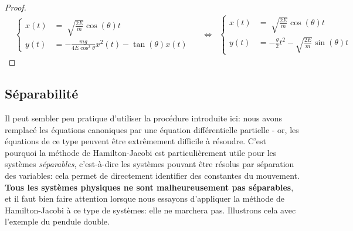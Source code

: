 \documentclass[11pt,oneside,a4paper]{article}
\begin{document}
\begin{proof}
\begin{align}
        &\begin{cases}
          x(t) &= \sqrt[]{\frac{2E}{m}}\cos\left(\theta\right)t\\
          y(t) &= -\frac{mg}{4E\cos^2\theta}x^2(t)-\tan\left(\theta\right) x(t)
        \end{cases} &
        &\Leftrightarrow &
        \begin{cases}
          x(t) &= \sqrt[]{\frac{2E}{m}}\cos\left(\theta\right)t\\
          y(t) &= -\frac{g}{2}t^2-\sqrt{\frac{2E}{m}}\sin\left(\theta\right) t
        \end{cases}
      \end{align}
    \end{proof}
    \color{gray}
    \subsection{Séparabilité}\label{sec: separabilite}

    Il peut sembler peu pratique d'utiliser la procédure introduite ici: nous avons remplacé les équations canoniques par une équation différentielle partielle - or, les équations de ce type peuvent être extrêmement difficile à résoudre. C'est pourquoi la méthode de Hamilton-Jacobi est particulièrement utile pour les systèmes \emph{séparables}, c'est-à-dire les systèmes pouvant être résolus par séparation des variables: cela permet de directement identifier des constantes du mouvement. \textbf{Tous les systèmes physiques ne sont malheureusement pas séparables}, et il faut bien faire attention lorsque nous essayons d'appliquer la méthode de Hamilton-Jacobi à ce type de systèmes: elle ne marchera pas. Illustrons cela avec l'exemple du pendule double.
\end{document}
